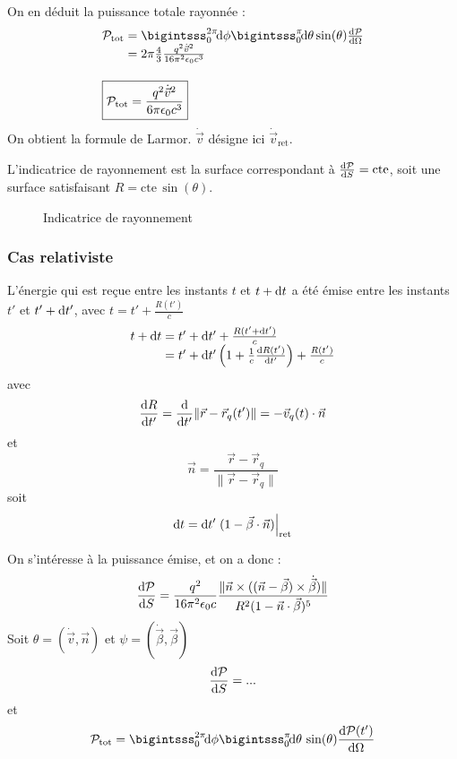 On en déduit la puissance totale rayonnée :
$$
	\begin{array}{r@{\;}l}
		\mathcal{P}_\text{tot}&=\bigintsss_0^{2\pi}\!\dif\phi\bigintsss_0^\pi\!\dif\theta\sin(\theta)\frac{\dif\mathcal{P}}{\dif\Omega}\\
			&=2\pi\frac{4}{3}\frac{q^2\dot{\vec{v}}^2}{16\pi^2\epsilon_0c^3}\\[15pt]
			\multicolumn{2}{l}{\boxed{\mathcal{P_\text{tot}}=\frac{q^2\dot{\vec{v}}^2}{6\pi\epsilon_0c^3}}}
	\end{array}
$$
On obtient la formule de Larmor. $\dot{\vec{v}}$ désigne ici $\dot{\vec{v}}_\text{ret}$.

L'indicatrice de rayonnement est la surface correspondant à $\frac{\mathrm{d}\mathcal{P}}{\mathrm{d} S}=\text{cte}$, soit une surface satisfaisant $R=\text{cte}\,\sin(\theta)$.

\begin{figure}[H]
\centering
{}
\caption*{Indicatrice de rayonnement}
\end{figure}

\subsubsection{Cas relativiste}

L'énergie qui est reçue entre les instants $t$ et $t+\mathrm{d} t$ a été émise entre les instants $t'$ et $t'+\mathrm{d} t'$, avec $t=t'+\frac{R(t')}{c}$
$$
	\begin{array}{r@{\;}l}
		t+\dif t&=t'+\dif t'+\frac{R(t'+\dif t')}{c}\\
			&=t'+\dif t'\left(1+\frac{1}{c}\frac{\dif R(t')}{\dif t'}\right)+\frac{R(t')}{c}
	\end{array}
$$
avec
$$
	\frac{\mathrm{d} R}{\mathrm{d} t'}=\frac{\mathrm{d}}{\mathrm{d} t'}\|\vec{r}-\vec{r}_q(t')\|=-\vec{v}_q(t)\cdot\vec{n}
$$
et
$$
	\vec{n}=\frac{\vec{r}-\vec{r}_q}{\|\vec{r}-\vec{r}_q\|}
$$
soit 
$$
	\mathrm{d} t = \mathrm{d} t'\left.(1-\vec{\beta}\cdot\vec{n})\right|_\text{ret}
$$

On s'intéresse à la puissance émise, et on a donc :
$$
	\frac{\mathrm{d} \mathcal{P}}{\mathrm{d} S}=\frac{q^2}{16\pi^2\epsilon_0c}\frac{\|\vec{n}\times((\vec{n}-\vec{\beta})\times\dot{\vec{\beta}})\|}{R^2(1-\vec{n}\cdot\vec{\beta})^5}
$$
Soit $\theta=(\dot{\vec{v}},\vec{n})$ et $\psi=(\dot{\vec{\beta}},\vec{\beta})$
$$
	\frac{\mathrm{d} \mathcal{P}}{\mathrm{d} S}=...
$$
et
$$
	\mathcal{P}_\text{tot}=\bigintsss_0^{2\pi}\!\dif\phi\bigintsss_0^\pi\!\dif\theta\,\sin(\theta)\frac{\dif\mathcal{P}(t')}{\dif\Omega}
$$

